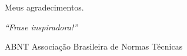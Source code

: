 \documentclass[
	12pt,				%
	openright,			%
	twoside,			%
	a4paper,			%
	english,			%
    french,             %
	spanish,			%
	brazil				%
	]{abntex2}
\begin{document}
\begin{agradecimentos}
	Meus agradecimentos.

\end{agradecimentos}

\begin{epigrafe}
	\vspace*{\fill}
	\begin{flushright}
		\textit{``Frase inspiradora!''}
	\end{flushright}
\end{epigrafe}






\listoffigures*
\cleardoublepage

\listoftables*
\cleardoublepage

\begin{siglas}
	\item[ABNT] Associação Brasileira de Normas Técnicas
\end{siglas}


\tableofcontents*
\cleardoublepage

\textual




\end{document}
